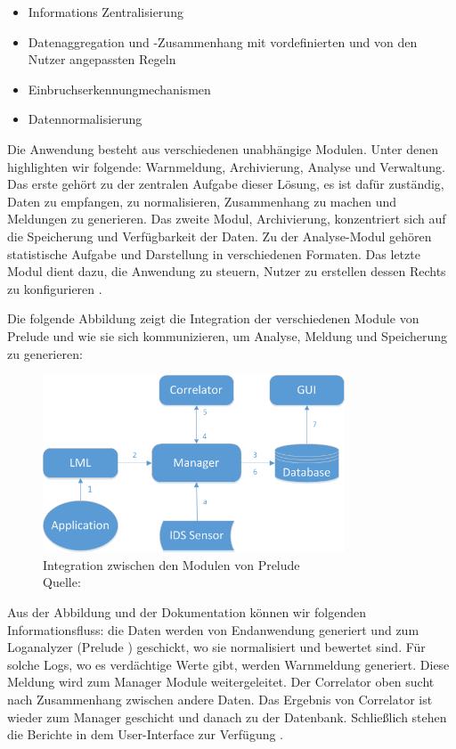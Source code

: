 \begin{itemize}[noitemsep]
   \item Informations Zentralisierung 
   \item Datenaggregation und -Zusammenhang mit vordefinierten und von den Nutzer angepassten Regeln 
   \item Einbruchserkennungmechanismen
   \item Datennormalisierung
\end{itemize}

Die Anwendung besteht aus verschiedenen unabhängige Modulen. Unter denen highlighten wir folgende: Warnmeldung, Archivierung, Analyse und Verwaltung. Das erste gehört zu der zentralen Aufgabe dieser Lösung, es ist dafür zuständig, Daten zu empfangen, zu normalisieren, Zusammenhang zu machen und Meldungen zu generieren. Das zweite Modul, Archivierung, konzentriert sich auf die Speicherung und Verfügbarkeit der Daten. Zu der Analyse-Modul gehören statistische Aufgabe und Darstellung in verschiedenen Formaten. Das letzte Modul dient dazu, die Anwendung zu steuern, Nutzer zu erstellen dessen Rechts zu konfigurieren \citep{EC_Prelude}.

Die folgende Abbildung zeigt die Integration der verschiedenen Module von Prelude und wie sie sich kommunizieren, um Analyse, Meldung und Speicherung zu generieren:

\begin{figure}[H]
   \centering
   \includegraphics[width=0.8\textwidth]{assets/2_p3.png}
   \caption{Integration zwischen den Modulen von Prelude \\Quelle: \citep{Prelude_MU} }
   \centering
\end{figure}

Aus der Abbildung und der Dokumentation können wir folgenden Informationsfluss: die Daten werden von Endanwendung generiert und zum Loganalyzer (Prelude ) geschickt, wo sie normalisiert und bewertet sind. Für solche Logs, wo es verdächtige Werte gibt, werden Warnmeldung generiert. Diese Meldung wird zum Manager Module weitergeleitet. Der Correlator oben sucht nach Zusammenhang zwischen andere Daten. Das Ergebnis von Correlator ist wieder zum Manager geschicht und danach zu der Datenbank. Schließlich stehen die Berichte in dem User-Interface zur Verfügung \citep{Prelude_Doc}.

